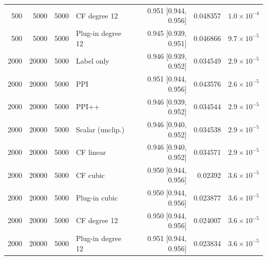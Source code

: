{\begin{longtable}{rrrlrrr}
500 & 5000 & 5000 & CF degree 12 & 0.951 [0.944, 0.956] & 0.048357 & $1.0\times 10^{-4}$ \\
500 & 5000 & 5000 & Plug-in degree 12 & 0.945 [0.939, 0.951] & 0.046866 & $9.7\times 10^{-5}$ \\
2000 & 20000 & 5000 & Label only & 0.946 [0.939, 0.952] & 0.034549 & $2.9\times 10^{-5}$ \\
2000 & 20000 & 5000 & PPI & 0.951 [0.944, 0.956] & 0.043576 & $2.6\times 10^{-5}$ \\
2000 & 20000 & 5000 & PPI++ & 0.946 [0.939, 0.952] & 0.034544 & $2.9\times 10^{-5}$ \\
2000 & 20000 & 5000 & Scalar (unclip.) & 0.946 [0.940, 0.952] & 0.034538 & $2.9\times 10^{-5}$ \\
2000 & 20000 & 5000 & CF linear & 0.946 [0.940, 0.952] & 0.034571 & $2.9\times 10^{-5}$ \\
2000 & 20000 & 5000 & CF cubic & 0.950 [0.944, 0.956] & 0.02392 & $3.6\times 10^{-5}$ \\
2000 & 20000 & 5000 & Plug-in cubic & 0.950 [0.944, 0.956] & 0.023877 & $3.6\times 10^{-5}$ \\
2000 & 20000 & 5000 & CF degree 12 & 0.950 [0.944, 0.956] & 0.024007 & $3.6\times 10^{-5}$ \\
2000 & 20000 & 5000 & Plug-in degree 12 & 0.951 [0.944, 0.956] & 0.023834 & $3.6\times 10^{-5}$ \\
\end{longtable}}
